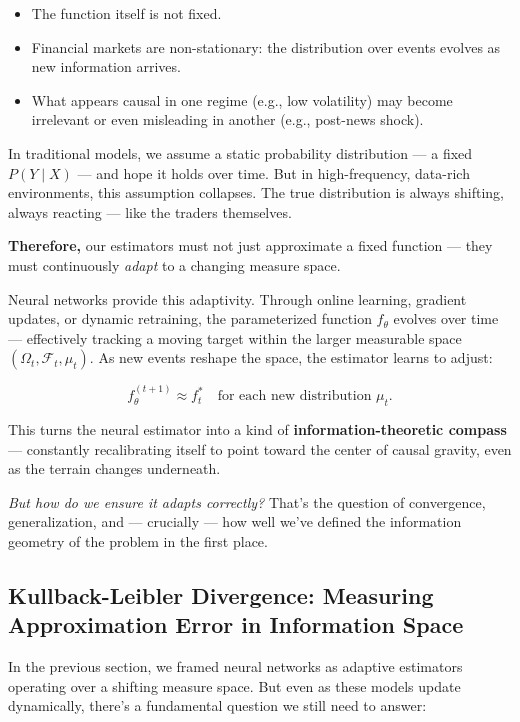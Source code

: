 \begin{itemize}
    \item The function itself is not fixed.
    \item Financial markets are non-stationary: the distribution over events evolves as new information arrives.
    \item What appears causal in one regime (e.g., low volatility) may become irrelevant or even misleading in another (e.g., post-news shock).
\end{itemize}

In traditional models, we assume a static probability distribution — a fixed \( P(Y \mid X) \) — and hope it holds over time. But in high-frequency, data-rich environments, this assumption collapses. The true distribution is always shifting, always reacting — like the traders themselves.

\textbf{Therefore,} our estimators must not just approximate a fixed function — they must continuously \textit{adapt} to a changing measure space.

\vspace{0.5em}
Neural networks provide this adaptivity. Through online learning, gradient updates, or dynamic retraining, the parameterized function \( f_\theta \) evolves over time — effectively tracking a moving target within the larger measurable space \( (\Omega_t, \mathcal{F}_t, \mu_t) \). As new events reshape the space, the estimator learns to adjust:

\[
f_\theta^{(t+1)} \approx f^*_t \quad \text{for each new distribution } \mu_t.
\]

This turns the neural estimator into a kind of \textbf{information-theoretic compass} — constantly recalibrating itself to point toward the center of causal gravity, even as the terrain changes underneath.

\textit{But how do we ensure it adapts correctly?} That’s the question of convergence, generalization, and — crucially — how well we’ve defined the information geometry of the problem in the first place.


\subsection{Kullback-Leibler Divergence: Measuring Approximation Error in Information Space}

In the previous section, we framed neural networks as adaptive estimators operating over a shifting measure space. But even as these models update dynamically, there's a fundamental question we still need to answer:

